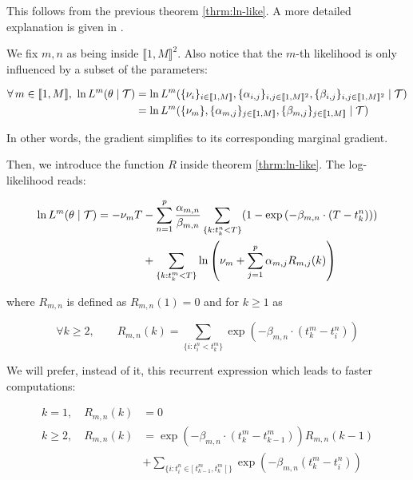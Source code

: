 \documentclass[11pt]{book}
\newcommand{\lsum}[1]{\sum_{ \{k : t_k^#1 < T \} }}
\newcommand{\lexp}[1]{
\exp \left ( - \beta_{m,n} \cdot ( T - t_k^#1 ) \right ) 
}
\newcommand{\denomR}{\nu_m + \sum_{j=1}^p \alpha_{m,j} R_{m,j} (k) }
\begin{document}
This follows from the previous theorem \ref{thrm:ln-like}. A more detailed explanation is given in \cite{Likelihood_Hawkes}.



We fix $m,n$ as being inside $\llbracket 1, M \rrbracket ^2 $. Also notice that the $m$-th likelihood is only influenced by a subset of the parameters:

\begin{align*}
\forall m \in \llbracket 1, M \rrbracket , \  \ln L^m( \theta \mid \Tau ) &= \ln L^m( 
\{ \nu_i \}_{ i \in  \llbracket 1, M \rrbracket  },
\{ \alpha_{i,j} \} _{ i,j \in  \llbracket 1, M \rrbracket ^2 },
\{ \beta_{i,j} \}_{ i,j \in  \llbracket 1, M \rrbracket ^2 }
\mid \Tau ) \\
&= \ln L^m( 
\{ \nu_m \},
\{ \alpha_{m,j} \} _{ j \in  \llbracket 1, M \rrbracket  },
\{ \beta_{m,j} \}_{j \in  \llbracket 1, M \rrbracket  }
\mid \Tau )
\end{align*}

In other words, the gradient simplifies to its corresponding marginal gradient. 

Then, we introduce the function $R$ inside theorem \ref{thrm:ln-like}. The log-likelihood reads:


\begin{align}
\ln L^m( \theta \mid \Tau ) = - \nu_m T &- \sum^p_{n=1} \frac {\alpha_{m,n} } {\beta_{m,n}}  \lsum{n} (1 - \lexp{n}) \notag \\ 
&+ \lsum{m} \ln \left ( \denomR \right ) 
\end{align}

where $R_{m,n}$ is defined as $R_{m,n}(1) = 0 $ and for $k \geq 1$ as  

\begin{equation*}
\forall k \geq 2, \qquad R_{m,n} (k) = \sum_{ \{i : t_i^n < t_k^m \} } \exp \left ( - \beta_{m,n} \cdot ( t_k^m - t_i^n )  \right ) 
\end{equation*}

We will prefer, instead of it, this recurrent expression which leads to faster computations:

\begin{align*}
k = 1, \quad R_{m,n} (k) &= 0 \\
k \geq 2, \quad R_{m,n} (k) &= \exp ( - \beta_{m,n} \cdot ( t_k^m - t^m_{k-1} ) ) R_{m,n} (k-1) \\ 
& + \sum_{ \{i: t_i^n \in [ \ t_{k-1}^m, t_k^m \ [ \  \} } \exp ( - \beta_{m,n} ( t^m_k - t_i^n ) )
\end{align*}
\end{document}
